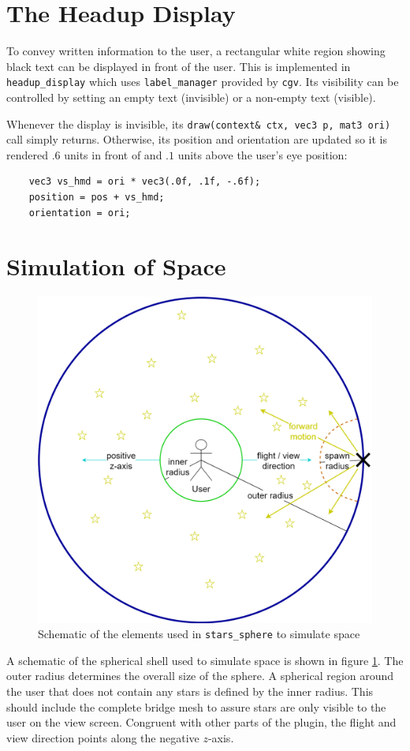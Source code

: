 \documentclass[hyperref, bachelorofscience]{cgvpub}
\begin{document}
\section{The Headup Display} \label{sec:hd}
To convey written information to the user, a rectangular white region showing black text can be displayed in front of the user. This is implemented in \lstinline|headup_display| which uses \lstinline|label_manager| provided by \lstinline|cgv|. Its visibility can be controlled by setting an empty text (invisible) or a non-empty text (visible).

Whenever the display is invisible, its \lstinline|draw(context& ctx, vec3 p, mat3 ori)| call simply returns. Otherwise, its position and orientation are updated so it is rendered $ .6 $ units in front of and $ .1 $ units above the user's eye position:
\begin{lstlisting}
	vec3 vs_hmd = ori * vec3(.0f, .1f, -.6f);
	position = pos + vs_hmd;
	orientation = ori;
\end{lstlisting}

\section{Simulation of Space} \label{sec:space}
\begin{figure}
	\centering
	\includegraphics[width=.7\linewidth]{../pics/stars_sphere_schema}
	\caption{Schematic of the elements used in \lstinline|stars_sphere| to simulate space}
	\label{fig:space}
\end{figure}

A schematic of the spherical shell used to simulate space is shown in figure \ref{fig:space}. The outer radius determines the overall size of the sphere. A spherical region around the user that does not contain any stars is defined by the inner radius. This should include the complete bridge mesh to assure stars are only visible to the user on the view screen. Congruent with other parts of the plugin, the flight and view direction points along the negative $ z $-axis. 
\end{document}
